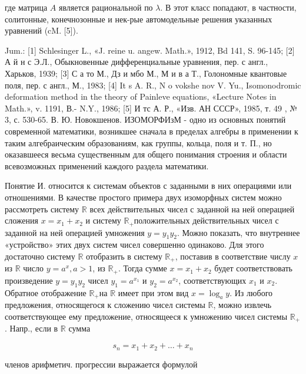 \documentclass[10pt]{article}
\begin{document}
где матрица $A$ является рациональной по $\lambda$. В этот класс попадают, в частности, солитонные, конечнозонные и нек-рые автомодельные решения указанных уравнений (cM. [5]).



Jum.: [1] Schlesinger L., «J. reine u. angew. Math.», 1912, Bd 141, S. 96-145; [2] А й н с Э.Л., Обыкновенные дифференциальные уравнения, пер. с англ., Харьков, 1939; [3] С а то М., Дз и мбо М., М и в а Т., Голономные квантовые поля, пер. с англ., М., 1983; [4] It s A. R., N o vokshe nov V. Yu., Isomonodromic deformation method in the theory of Painleve equations, «Lecture Notes in Math.», v. 1191, В.- N.Y., 1986; [5] И тс А. Р., «Изв. АН СССР», 1985, т. 49 , № 3, с. 530-65. В. Ю. Новокшенов. ИЗОМОРФИзМ - одно из основных понятий современной математики, возникшее сначала в пределах алгебры в применении к таким алгебраическим образованиям, как группы, кольца, поля и т. П., но оказавшееся весьма существенным для общего понимания строения и области всевозможных применений каждого раздела математики.



Понятие И. относится к системам объектов с заданными в них операциями или отношениями. В качестве простого примера двух изоморфных систем можно рассмотреть систему $\mathbb{R}$ всех действительных чисел с заданной на ней операцией сложения $x=x_{1}+x_{2}$ и систему $\mathbb{R}_{+}$положительных действительных чисел с заданной на ней операцией умножения $y=y_{1} y_{2}$. Можно показать, что внутреннее «устройство» этих двух систем чисел совершенно одинаково. Для этого достаточно систему $\mathbb{R}$ отобразить в систему $\mathbb{R}_{+}$, поставив в соответствие числу $x$ из $\mathbb{R}$ число $y=a^{x}, a>1$, из $\mathbb{R}_{+}$. Тогда сумме $x=x_{1}+x_{2}$ будет соответствовать произведение $y=y_{1} y_{2}$ чисел $y_{1}=a^{x_{1}}$ и $y_{2}=a^{x_{2}}$, соответствующих $x_{1}$ и $x_{2}$. Обратное отображение $\mathbb{R}_{+}$на $\mathbb{R}$ имеет при этом вид $x=\log _{a} y$. Из любого предложения, относящегося к сложению чисел системы $\mathbb{R}$, можно извлечь соответствующее ему предложение, относящееся к умножению чисел системы $\mathbb{R}_{+}$. Напр., если в $\mathbb{R}$ сумма



\[

s_{n}=x_{1}+x_{2}+\ldots+x_{n}

\]



членов арифметич. прогрессии выражается формулой
\end{document}
